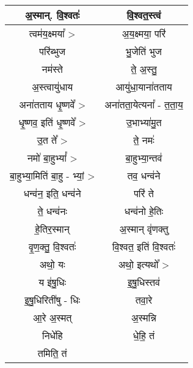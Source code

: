 {\begin{longtable}{|c|c|}
\hline
अ॒स्मान्. वि॒श्वतः॑            & वि॒श्वत॒स्त्वं\\
\hline
त्वम॑य॒क्ष्मया᳚ >              & अ॒य॒क्ष्मया॒ परि॑\\
\hline
परि॑ब्भुज                   & भु॒जेति॑ भुज\\
\hline
नम॑स्ते                     & ते॒ अ॒स्तु॒\\
\hline
अ॒स्त्वायु॑धाय                & आयु॑धा॒याना॑तताय\\
\hline
अना॑तताय धृ॒ष्णवे᳚ >           & अना॑तता॒येत्यना᳚ - त॒ता॒य॒\\
\hline
धृ॒ष्णव॒ इति॑ धृ॒ष्णवे᳚ >          & उ॒भाभ्या॑मु॒त\\
\hline
उ॒त ते᳚ >                   & ते॒ नमः॑\\
\hline
नमो॑ बा॒हुभ्यां᳚ >             & बा॒हुभ्या॒न्तव॑\\
\hline
बा॒हुभ्या॒मिति॑ बा॒हु - भ्यां॒ >   & तव॒ धन्व॑ने\\
\hline
धन्व॑न॒ इति॒ धन्व॑ने            & परि॑ ते\\
\hline
ते॒ धन्व॑नः                  & धन्व॑नो हे॒तिः\\
\hline
हे॒तिर॒स्मान्                 & अ॒स्मान् वृ॑णक्तु\\
\hline
वृ॒ण॒क्तु॒ वि॒श्वतः॑              & वि॒श्वत॒ इति॑ वि॒श्वतः॑\\
\hline
अथो॒ यः                   & अथो॒ इत्यथो᳚ >\\
\hline
य इ॑षु॒धिः                  & इ॒षु॒धिस्तव॑\\
\hline
इ॒षु॒धिरिती॑षु - धिः          & तवा॒रे\\
\hline
आ॒रे अ॒स्मत्                  & अ॒स्मन्नि\\
\hline
निधे॑हि                    & धे॒हि॒ तं\\
\hline
तमिति॒ तं                  & \\
\hline
\end{longtable}
}
